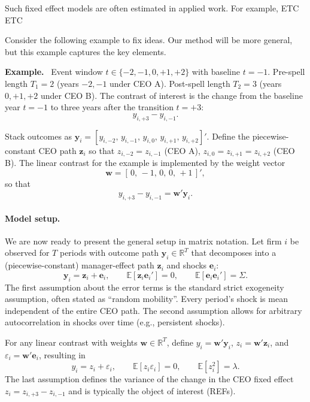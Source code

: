 \documentclass[11pt,a4paper]{article}
\begin{document}
Such fixed effect models are often estimated in applied work. For example, \citet{Bertrand2003-io} ETC ETC


\newenvironment{example}{\par\noindent\textbf{Example.}\ }{\par}

Consider the following example to fix ideas. Our method will be more general, but this example captures the key elements.
\begin{example}
Event window $t\in\{-2,-1,0,+1,+2\}$ with baseline $t=-1$. Pre-spell length $T_1=2$ (years $-2,-1$ under CEO A). Post-spell length $T_2=3$ (years $0, +1,+2$ under CEO B). The contrast of interest is the change from the baseline year $t=-1$ to three years after the transition $t=+3$:
\[
y_{i,+3} - y_{i,-1}.
\]
\end{example}

Stack outcomes as $\mathbf y_i=[y_{i,-2},\,y_{i,-1},\,y_{i,0},\,y_{i,+1},\,y_{i,+2}]'$. Define the piecewise-constant CEO path $\mathbf z_i$ so that $z_{i,-2}=z_{i,-1}$ (CEO A), $z_{i,0} = z_{i,+1}=z_{i,+2}$ (CEO B). The linear contrast for the example is implemented by the weight vector
\[
  \mathbf w = [\,0,\,-1,\,0,\,0,\,+1\,]',
\]
so that 
$$
y_{i,+3} - y_{i,-1} = \mathbf w' \mathbf y_i.
$$

\paragraph{Model setup.} We are now ready to present the general setup in matrix notation. Let firm $i$ be observed for $T$ periods with outcome path $\mathbf y_i\in\mathbb R^T$ that decomposes into a (piecewise-constant) manager-effect path $\mathbf z_i$ and shocks $\mathbf e_i$:
\begin{equation}
\mathbf y_i = \mathbf z_i + \mathbf e_i,
\qquad \mathbb E[\mathbf z_i\mathbf e_i']=0,
\qquad \mathbb E[\mathbf e_i\mathbf e_i']=\Sigma.
\end{equation}
The first assumption about the error terms is the standard strict exogeneity assumption, often stated as ``random mobility''. Every period's shock is mean independent of the entire CEO path. The second assumption allows for arbitrary autocorrelation in shocks over time (e.g., persistent shocks).

For any linear contrast with weights $\mathbf w\in\mathbb R^T$, define $y_i=\mathbf w'\mathbf y_i$, $z_i=\mathbf w'\mathbf z_i$, and $\varepsilon_i=\mathbf w'\mathbf e_i$, resulting in
\begin{equation}
y_i = z_i + \varepsilon_i,
\qquad \mathbb E[z_i\varepsilon_i]=0,
\qquad \mathbb E[z_i^2] = \lambda.
\end{equation}
The last assumption defines the variance of the change in the CEO fixed effect $z_i = z_{i,+3} - z_{i,-1}$ and is typically the object of interest (REFs).
\end{document}

